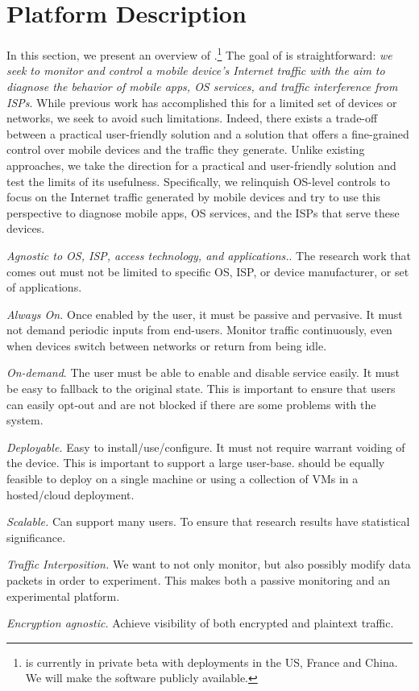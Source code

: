 \section{Platform Description}

In this section, we present an overview of \meddle.\footnote{\meddle is currently in private beta with deployments in the US, France and China. We will make the \meddle software publicly available.} 
The goal of \meddle is straightforward: \emph{we seek to monitor and control a mobile device's Internet traffic with the aim to diagnose the behavior of mobile apps, OS services, and traffic interference from ISPs}. 
While previous work has accomplished this for a limited set of devices or networks, we seek to avoid such limitations. 
Indeed, there exists a trade-off between a practical user-friendly solution and a solution that offers a fine-grained control over mobile devices and the traffic they generate.
Unlike existing approaches, we take the direction for a practical and user-friendly solution and test the limits of its usefulness.
Specifically, we relinquish OS-level controls to focus on the Internet traffic generated by mobile devices and try to use this perspective to diagnose mobile apps, OS services, and the ISPs that serve these devices.

\begin{packedenumerate}
\item \emph{Agnostic to OS, ISP, access technology, and applications.}.
The research work that comes out must not be limited to specific OS, ISP, or device manufacturer, or set of applications.
\item \emph{Always On.}
Once enabled by the user, it must be passive and pervasive.
It must not demand periodic inputs from end-users.
Monitor traffic continuously, even when devices switch 
between networks or return from being idle.
\item \emph{On-demand}.
The user must be able to enable and disable service easily.
It must be easy to fallback to the original state.
This is important to ensure that users can easily opt-out and are not blocked if there are some problems with the system.
\item \emph{Deployable.}
Easy to install/use/configure.
It must not require warrant voiding of the device.
This is important to support a large user-base.
\meddle should be equally feasible to deploy  on a single machine or using a collection of VMs in a hosted/cloud deployment. 
\item \emph{Scalable.}
Can support many users.
To ensure that research results have statistical significance.
\item \emph{Traffic Interposition.} 
We want to not only monitor, but also possibly modify data packets in order to experiment. 
This makes \meddle both a passive monitoring and an experimental platform. 
\item \emph{Encryption agnostic.} Achieve visibility of both encrypted and plaintext traffic.
\end{packedenumerate}    

